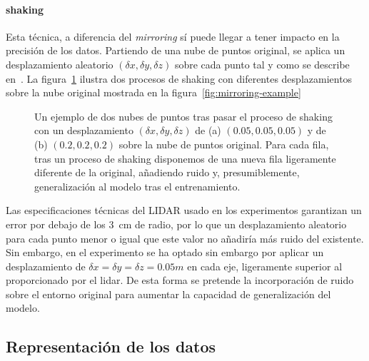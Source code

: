 \paragraph{shaking}

Esta técnica, a diferencia del \textit{mirroring} sí puede llegar a tener impacto en la precisión de los datos. Partiendo de una nube de puntos original, se aplica un desplazamiento aleatorio $(\delta x, \delta y, \delta z)$ sobre cada punto tal y como se describe en~\cite{EL PAPER CUANDO NOS LO PUBLIQUEN}. La figura~\ref{fig:shaking-example} ilustra dos procesos de shaking con diferentes desplazamientos sobre la nube original mostrada en la figura~\ref{fig:mirroring-example}

\begin{figure}
	\centering
	\qquad
	\caption[Ejemplo de la técnica de \textit{shaking}]{Un ejemplo de dos nubes de puntos tras pasar el proceso de shaking con un desplazamiento $(\delta x, \delta y, \delta z)$ de (a) $(0.05, 0.05, 0.05)$ y de (b) $(0.2, 0.2, 0.2)$ sobre la nube de puntos original. Para cada fila, tras un proceso de shaking disponemos de una nueva fila ligeramente diferente de la original, añadiendo ruido y, presumiblemente, generalización al modelo tras el entrenamiento.}
	\label{fig:shaking-example}
\end{figure}

Las especificaciones técnicas del LIDAR usado en los experimentos garantizan un error por debajo de los \SI{3}{\cm} de radio, por lo que un desplazamiento aleatorio para cada punto menor o igual que este valor no añadiría más ruido del existente. Sin embargo, en el experimento se ha optado sin embargo por aplicar un desplazamiento de $\delta x = \delta y = \delta z = 0.05m$ en cada eje, ligeramente superior al proporcionado por el lidar. De esta forma se pretende la incorporación de ruido sobre el entorno original para aumentar la capacidad de generalización del modelo.

\subsection{Representación de los datos}

